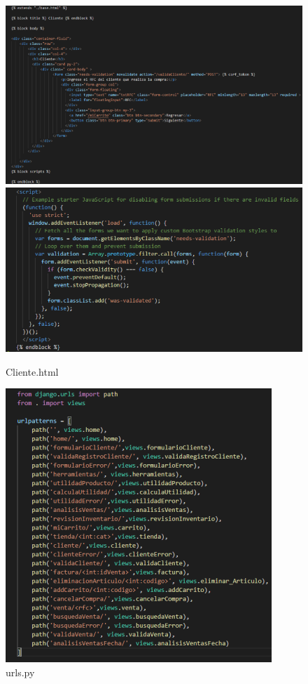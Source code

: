 \documentclass[12pt,letterpaper]{article}
\begin{document}
	\begin{figure}[H]
		\centering
		\includegraphics[scale=0.70]{Documentacion/img/lineasCliente.png}
		\includegraphics[scale=0.60]{Documentacion/img/lineasCliente2.png}
		\caption{Cliente.html}
	\end{figure}
	
	\begin{figure}[H]
		\centering
		\includegraphics[scale=0.70]{Documentacion/img/urls.png}
		\caption{urls.py}
	\end{figure}
	
\end{document}
